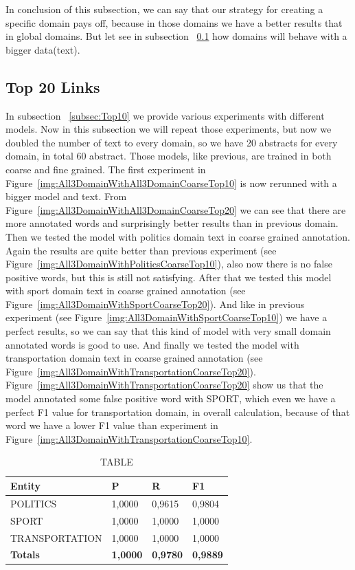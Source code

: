 \documentclass[thesis=M,english]{FITthesis}[2018/05/30]
\begin{document}
	In conclusion of this subsection, we can say that our strategy for creating a specific domain pays off, because in those domains we have a better results that in global domains. But let see in subsection ~\ref{subsec:Top20} how domains will behave with a bigger data(text).

\subsection{Top 20 Links}\label{subsec:Top20}
	In subsection ~\ref{subsec:Top10} we provide various experiments with different models. Now in this subsection we will repeat those experiments, but now we doubled the number of text to every domain, so we have 20 abstracts for every domain, in total 60 abstract. Those models, like previous, are trained in both coarse and fine grained.
	The first experiment in Figure~\ref{img:All3DomainWithAll3DomainCoarseTop10} is now rerunned with a bigger model and text. From Figure~\ref{img:All3DomainWithAll3DomainCoarseTop20} we can see that there are more annotated words and surprisingly better results than in previous domain.
	Then we tested the model with politics domain text in coarse grained annotation. Again the results are quite better than previous experiment (see Figure~\ref{img:All3DomainWithPoliticsCoarseTop10}), also now there is no false positive words, but this is still not satisfying.
	After that we tested this model with sport domain text in coarse grained annotation (see Figure~\ref{img:All3DomainWithSportCoarseTop20}). And like in previous experiment (see Figure~\ref{img:All3DomainWithSportCoarseTop10}) we have a perfect results, so we can say that this kind of model with very small domain annotated words is good to use.
	And finally we tested the model with transportation domain text in coarse grained annotation (see Figure~\ref{img:All3DomainWithTransportationCoarseTop20}). Figure~\ref{img:All3DomainWithTransportationCoarseTop20} show us that the model annotated some false positive word with SPORT, which even we have a perfect F1 value for transportation domain, in overall calculation, because of that word we have a lower F1 value than experiment in Figure~\ref{img:All3DomainWithTransportationCoarseTop10}.

	\begin{table}[H]\centering
		\caption{TABLE}
		\label{}
		\begin{tabular}{|l|l|l|l|}
			\hline {\textbf{Entity}} & {\textbf{P}} & {\textbf{R}} & {\textbf{F1}}\\\hline
				POLITICS & 1,0000 & 0,9615 & 0,9804\\
				SPORT & 1,0000 & 1,0000 & 1,0000\\
				TRANSPORTATION & 1,0000 & 1,0000 & 1,0000\\\hline
				\textbf{Totals} & \textbf{1,0000} & \textbf{0,9780} & \textbf{0,9889}\\\hline
		\end{tabular}
	\end{table}
\end{document}

